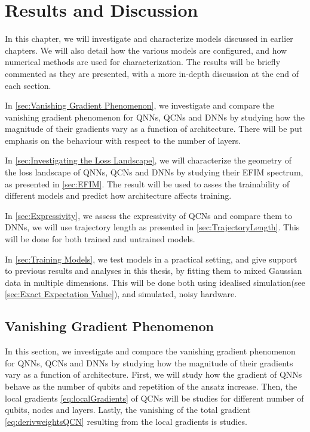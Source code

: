 \chapter{Results and Discussion}\label{chap:results_discussion}
In this chapter, we will investigate and characterize models discussed in earlier chapters. We will also detail how the various models are configured, and how numerical methods are used for characterization. The results will be briefly commented as they are presented, with a more in-depth discussion at the end of each section.

In \autoref{sec:Vanishing Gradient Phenomenon}, we investigate and compare the vanishing gradient phenomenon for QNNs, QCNs and DNNs by studying how the magnitude of their gradients vary as a function of architecture. There will be put emphasis on the behaviour with respect to the number of layers.

In \autoref{sec:Investigating the Loss Landscape}, we will characterize the geometry of the loss landscape of QNNs, QCNs and DNNs by studying their EFIM spectrum, as presented in \autoref{sec:EFIM}. The result will be used to asses the trainability of different models and predict how architecture affects training.

In \autoref{sec:Expressivity}, we assess the expressivity of QCNs and compare them to DNNs, we will use trajectory length as presented in \autoref{sec:TrajectoryLength}. This will be done for both trained and untrained models.

In \autoref{sec:Training Models}, we test models in a practical setting, and give support to previous results and analyses in this thesis, by fitting them to mixed Gaussian data in multiple dimensions. This will be done both using idealised simulation(see \autoref{sec:Exact Expectation Value}), and simulated, noisy hardware.


\section{Vanishing Gradient Phenomenon}\label{sec:Vanishing Gradient Phenomenon}
In this section, we investigate and compare the vanishing gradient phenomenon for QNNs, QCNs and DNNs by studying how the magnitude of their gradients vary as a function of architecture. First, we will study how the gradient of QNNs behave as the number of qubits and repetition of the ansatz increase. Then, the local gradients \autoref{eq:localGradients} of QCNs will be studies for different number of qubits, nodes and layers. Lastly, the vanishing of the total gradient \autoref{eq:derivweightsQCN} resulting from the local gradients is studies.  


